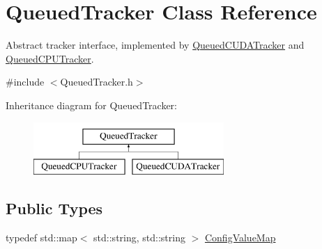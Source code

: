 \hypertarget{class_queued_tracker}{}\section{Queued\+Tracker Class Reference}
\label{class_queued_tracker}


Abstract tracker interface, implemented by \hyperlink{class_queued_c_u_d_a_tracker}{Queued\+C\+U\+D\+A\+Tracker} and \hyperlink{class_queued_c_p_u_tracker}{Queued\+C\+P\+U\+Tracker}.  




{\ttfamily \#include $<$Queued\+Tracker.\+h$>$}

Inheritance diagram for Queued\+Tracker\+:\begin{figure}[H]
\begin{center}
\leavevmode
\includegraphics[height=2.000000cm]{class_queued_tracker}
\end{center}
\end{figure}
\subsection*{Public Types}
\begin{DoxyCompactItemize}
\item 
typedef std\+::map$<$ std\+::string, std\+::string $>$ \hyperlink{class_queued_tracker_af6073682cd9e87e6f3e84f93cf9be373}{Config\+Value\+Map}
\end{DoxyCompactItemize}
